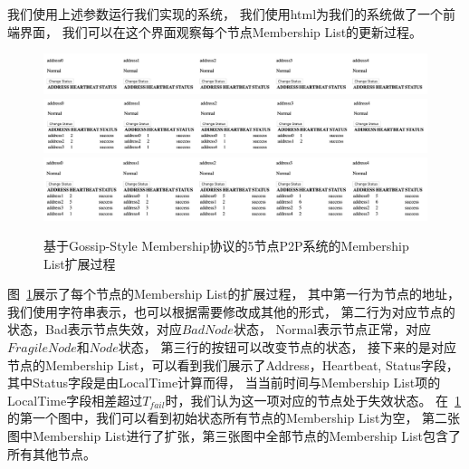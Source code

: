  我们使用上述参数运行我们实现的系统，
 我们使用html为我们的系统做了一个前端界面，
 我们可以在这个界面观察每个节点Membership List的更新过程。

 \begin{figure}[!htp]
   \begin{minipage}{0.9\textwidth}
     \centering
     \includegraphics[width=15cm]{../figures/demo/4.png}
     \\
     \includegraphics[width=15cm]{../figures/demo/5.png}
     \\
     \includegraphics[width=15cm]{../figures/demo/6.png}
   \end{minipage}
   \caption{基于Gossip-Style Membership协议的5节点P2P系统的Membership List扩展过程}
   \label{fig:demo_1}    
\end{figure}
 图~\ref{fig:demo_1}展示了每个节点的Membership List的扩展过程，
 其中第一行为节点的地址，我们使用字符串表示，也可以根据需要修改成其他的形式，
 第二行为对应节点的状态，Bad表示节点失效，对应$BadNode$状态，
 Normal表示节点正常，对应$FragileNode$和$Node$状态，
 第三行的按钮可以改变节点的状态，
 接下来的是对应节点的Membership List，可以看到我们展示了Address，Heartbeat, Status字段，
 其中Status字段是由LocalTime计算而得，
 当当前时间与Membership List项的LocalTime字段相差超过$T_{fail}$时，我们认为这一项对应的节点处于失效状态。
 在~\ref{fig:demo_1}的第一个图中，我们可以看到初始状态所有节点的Membership List为空，
 第二张图中Membership List进行了扩张，第三张图中全部节点的Membership List包含了所有其他节点。


